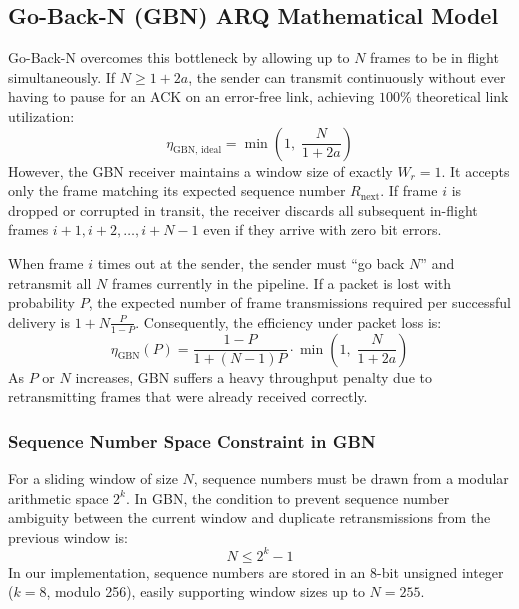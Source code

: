 \documentclass[11pt,a4paper]{article}
\begin{document}
\subsection{Go-Back-N (GBN) ARQ Mathematical Model}
Go-Back-N overcomes this bottleneck by allowing up to $N$ frames to be in flight simultaneously. If $N \ge 1 + 2a$, the sender can transmit continuously without ever having to pause for an ACK on an error-free link, achieving $100\%$ theoretical link utilization:
\begin{equation}
    \eta_{\text{GBN, ideal}} = \min\left(1, \; \frac{N}{1 + 2a}\right)
\end{equation}
However, the GBN receiver maintains a window size of exactly $W_r = 1$. It accepts only the frame matching its expected sequence number $R_{\text{next}}$. If frame $i$ is dropped or corrupted in transit, the receiver discards all subsequent in-flight frames $i+1, i+2, \dots, i+N-1$ even if they arrive with zero bit errors.

When frame $i$ times out at the sender, the sender must ``go back $N$'' and retransmit all $N$ frames currently in the pipeline. If a packet is lost with probability $P$, the expected number of frame transmissions required per successful delivery is $1 + N \frac{P}{1 - P}$. Consequently, the efficiency under packet loss is:
\begin{equation}
    \eta_{\text{GBN}}(P) = \frac{1 - P}{1 + (N - 1)P} \cdot \min\left(1, \; \frac{N}{1 + 2a}\right)
\end{equation}
As $P$ or $N$ increases, GBN suffers a heavy throughput penalty due to retransmitting frames that were already received correctly.

\subsubsection{Sequence Number Space Constraint in GBN}
For a sliding window of size $N$, sequence numbers must be drawn from a modular arithmetic space $2^k$. In GBN, the condition to prevent sequence number ambiguity between the current window and duplicate retransmissions from the previous window is:
\begin{equation}
    N \le 2^k - 1
\end{equation}
In our implementation, sequence numbers are stored in an 8-bit unsigned integer ($k = 8$, modulo 256), easily supporting window sizes up to $N = 255$.
\end{document}
